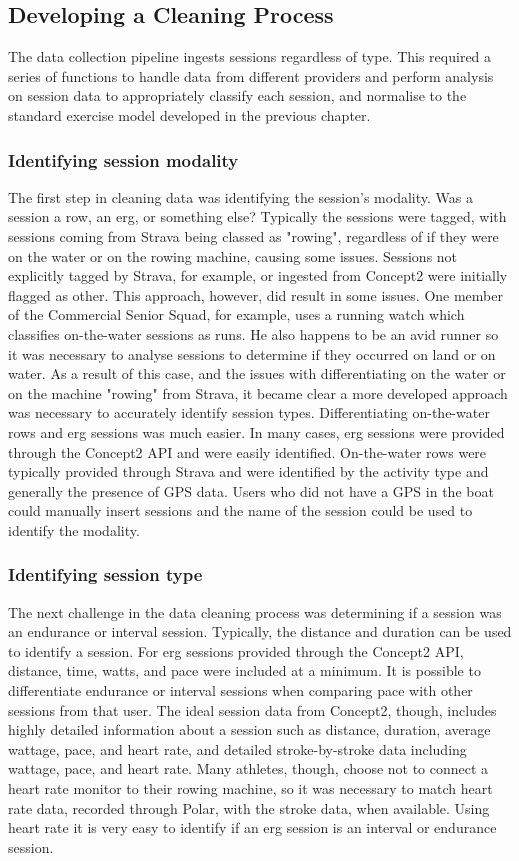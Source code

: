 \subsection{Developing a Cleaning Process}
The data collection pipeline ingests sessions regardless of type. This required a series of functions to handle data from different providers and perform analysis on session data to appropriately classify each session, and normalise to the standard exercise model developed in the previous chapter.

\subsubsection{Identifying session modality}
The first step in cleaning data was identifying the session's modality. Was a session a row, an erg, or something else? Typically the sessions were tagged, with sessions coming from Strava being classed as "rowing", regardless of if they were on the water or on the rowing machine, causing some issues. Sessions not explicitly tagged by Strava, for example, or ingested from Concept2 were initially flagged as other. This approach, however, did result in some issues. One member of the Commercial Senior Squad, for example, uses a running watch which classifies on-the-water sessions as runs. He also happens to be an avid runner so it was necessary to analyse sessions to determine if they occurred on land or on water. As a result of this case, and the issues with differentiating on the water or on the machine "rowing" from Strava, it became clear a more developed approach was necessary to accurately identify session types. Differentiating on-the-water rows and erg sessions was much easier. In many cases, erg sessions were provided through the Concept2 API and were easily identified. On-the-water rows were typically provided through Strava and were identified by the activity type and generally the presence of GPS data. Users who did not have a GPS in the boat could manually insert sessions and the name of the session could be used to identify the modality.


\subsubsection{Identifying session type}
The next challenge in the data cleaning process was determining if a session was an endurance or interval session. Typically, the distance and duration can be used to identify a session. For erg sessions provided through the Concept2 API, distance, time, watts, and pace were included at a minimum. It is possible to differentiate endurance or interval sessions when comparing pace with other sessions from that user. The ideal session data from Concept2, though, includes highly detailed information about a session such as distance, duration, average wattage, pace, and heart rate, and detailed stroke-by-stroke data including wattage, pace, and heart rate. Many athletes, though, choose not to connect a heart rate monitor to their rowing machine, so it was necessary to match heart rate data, recorded through Polar, with the stroke data, when available. Using heart rate it is very easy to identify if an erg session is an interval or endurance session.

